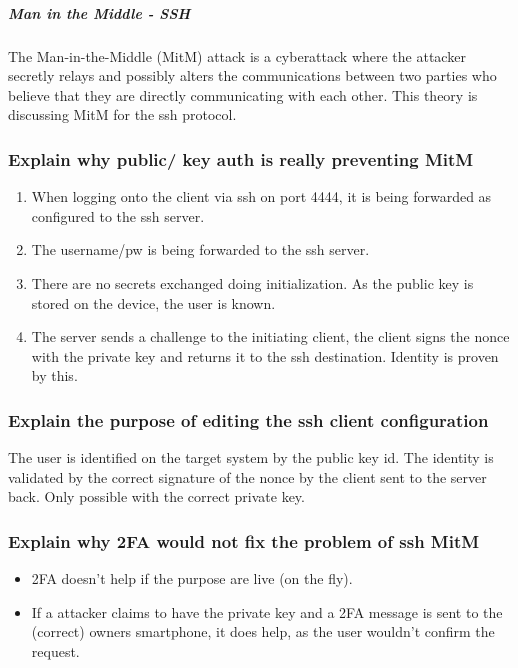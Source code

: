 \subparagraph{Man in the Middle - SSH}
The Man-in-the-Middle (MitM) attack is a cyberattack where the attacker secretly relays and possibly alters the communications between two parties who believe that they are directly communicating with each other. This theory is discussing MitM for the ssh protocol.

\subsubsection{Explain why public/ key auth is really preventing MitM}

\begin{enumerate}
    \item When logging onto the client via ssh on port 4444, it is being forwarded as configured to the ssh server.
    \item The username/pw is being forwarded to the ssh server.
    \item There are no secrets exchanged doing initialization. As the public key is stored on the device, the user is \glqq known\grqq.
    \item The server sends a challenge to the initiating client, the client signs the nonce with the private key and returns it to the ssh destination. Identity is proven by this.
\end{enumerate}

\subsubsection{Explain the purpose of editing the ssh client configuration}
The user is identified on the target system by the public key id. The identity is validated by the correct signature of the nonce by the client sent to the server back. Only possible with the correct private key.

\subsubsection{Explain why 2FA would not fix the problem of ssh MitM}
\begin{itemize}
    \item 2FA doesn't help if the purpose are live (on the fly).
    \item If a attacker claims to have the private key and a 2FA message is sent to the (correct) owners smartphone, it does help, as the user wouldn't confirm the request.
\end{itemize}

